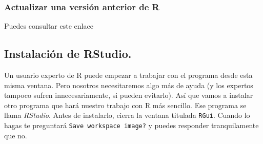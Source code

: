\documentclass[10pt,a4paper]{article}
\begin{document}
\subsubsection*{Actualizar una versión anterior de R}

Puedes consultar este enlace
\begin{center}
\end{center}

\subsection{Instalación de RStudio.}

Un usuario experto de R puede empezar a trabajar con el programa desde esta misma ventana. Pero
nosotros necesitaremos algo más de ayuda (y los expertos tampoco sufren innecesariamente, si pueden
evitarlo). Así que vamos a instalar otro programa que hará nuestro trabajo con R más sencillo. Ese
programa se llama {\em RStudio}. Antes de instalarlo, cierra la ventana titulada {\tt RGui}. Cuando
lo hagas te preguntará {\tt Save workspace image?} y puedes responder tranquilamente que no.
\end{document}
